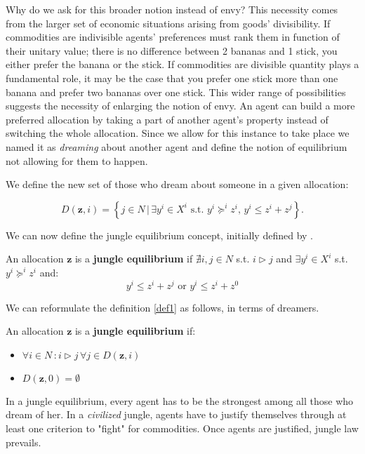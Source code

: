 Why do we ask for this broader notion instead of envy? This necessity comes from the larger set of economic situations arising from goods' divisibility. If commodities are indivisible agents' preferences must rank them in function of their unitary value; there is no difference between 2 bananas and 1 stick, you either prefer the banana or the stick. If commodities are divisible quantity plays a fundamental role, it may be the case that you prefer one stick more than one banana and prefer two bananas over one stick. This wider range of possibilities suggests the necessity of enlarging the notion of envy. An agent can build a more preferred allocation by taking a part of another agent's property instead of switching the whole allocation. Since we allow for this instance to take place we named it as \textit{dreaming} about another agent and define the notion of equilibrium not allowing for them to happen.

We define the new set of those who dream about someone in a given allocation:

\[ D(\textbf{z},i) = \left\{ j\in N\,|\,\exists y^i\in X^i \text{ s.t. } y^i\succeq^iz^i,\, y^i\leq z^i+z^j\right\}.\]

We can now define the jungle equilibrium concept, initially defined by \cite[PR]{P-R}.

\begin{definition}\label{def1}
    An allocation $\textbf{z}$ is a \textbf{jungle equilibrium} if $\nexists i,j\in N$ s.t. $i\triangleright j$ and $\exists y^i\in X^i$ s.t. $y^i\succeq^iz^i$ and:
    \[y^i\leq z^i+z^j\text{ or }y^i\leq z^i+z^0\]
\end{definition}

We can reformulate the definition \ref{def1} as follows, in terms of dreamers.

\begin{definition}\label{def2}
    An allocation $\textbf{z}$ is a \textbf{jungle equilibrium} if:
    \begin{itemize}
        \item $\forall i\in N\,:i\triangleright j\,\forall j\in D(\textbf{z},i)$
        \item $D(\textbf{z},0)=\emptyset$
    \end{itemize}
    
\end{definition}

In a jungle equilibrium, every agent has to be the strongest among all those who dream of her. In a \textit{civilized} jungle, agents have to justify themselves through at least one criterion to "fight" for commodities. Once agents are justified, jungle law prevails.

